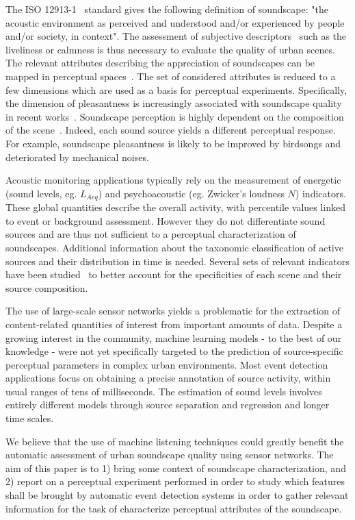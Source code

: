 \documentclass{article}
\begin{document}
\begin{sloppy}
The ISO 12913-1~\cite{iso2014} standard gives the following definition of soundscape: "the acoustic environment as perceived and understood and/or experienced by people and/or society, in context". The assessment of subjective descriptors~\cite{berglund2006, brown2011, aletta2016} such as the liveliness or calmness is thus necessary to evaluate the quality of urban scenes. The relevant attributes describing the appreciation of soundscapes can be mapped in perceptual spaces~\cite{axelsson2010, cain2013}. The set of considered attributes is reduced to a few dimensions which are used as a basis for perceptual experiments. Specifically, the dimension of pleasantness is increasingly associated with soundscape quality in recent works~\cite{decoensel2006, delaitre2014, ricciardi2014, aumond2017}. Soundscape perception is highly dependent on the composition of the scene~\cite{lavandier2006, nilsson2006}. Indeed, each sound source yields a different perceptual response. For example, soundscape pleasantness is likely to be improved by birdsongs and deteriorated by mechanical noises.

Acoustic monitoring applications typically rely on the measurement of energetic (sound levels, eg. $L_{Aeq}$) and psychoacoustic (eg. Zwicker's loudness $N$) indicators. These global quantities describe the overall activity, with percentile values linked to event or background assessment. However they do not differentiate sound sources and are thus not sufficient to a perceptual characterization of soundscapes. Additional information about the taxonomic classification of active sources and their distribution in time is needed. Several sets of relevant indicators have been studied~\cite{can2008, can2016, brocolini2013} to better account for the specificities of each scene and their source composition.

The use of large-scale sensor networks yields a problematic for the extraction of content-related quantities of interest from important amounts of data. Despite a growing interest in the community, machine learning models - to the best of our knowledge - were not yet specifically targeted to the prediction of source-specific perceptual parameters in complex urban environments. Most event detection applications focus on obtaining a precise annotation of source activity, within usual ranges of tens of milliseconds. The estimation of sound levels involves entirely different models through source separation and regression \cite{gloaguen2016} and longer time scales.

We believe that the use of machine listening techniques could greatly benefit the automatic assessment of urban soundscape quality using sensor networks. The aim of this paper is to 1) bring some context of soundscape characterization, and 2) report on a perceptual experiment performed in order to study which features shall be brought by automatic event detection systems in order to gather relevant information for the task of characterize perceptual attributes of the soundscape.



\end{sloppy}
\end{document}
